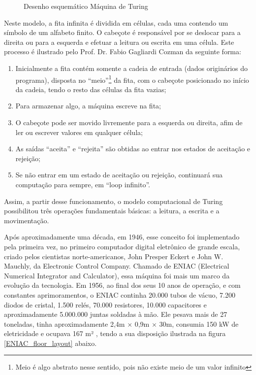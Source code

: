 \vspace{1cm}
\begin{figure}[H] \centering 
  \caption{\label{turing_machine} Desenho esquemático Máquina de Turing} 
\end{figure}

Neste modelo, a fita infinita é dividida em células, cada uma contendo um símbolo de um alfabeto finito. O cabeçote é responsável por se deslocar para a direita ou para a esquerda e efetuar a leitura ou escrita em uma célula. Este processo é ilustrado pelo Prof. Dr. Fabio Gagliardi Cozman \cite{7} da seguinte forma:

\begin{enumerate}
  \item Inicialmente a fita contém somente a cadeia de entrada (dados originários do programa), disposta no ``meio''\footnote{Meio é algo abstrato nesse sentido, pois não existe meio de um valor infinito} da fita, com o cabeçote posicionado no início da cadeia, tendo o resto das células da fita vazias;
  \item Para armazenar algo, a máquina escreve na fita;
  \item O cabeçote pode ser movido livremente para a esquerda ou direita, afim de ler ou escrever valores em qualquer célula;
  \item As saídas ``aceita'' e ``rejeita'' são obtidas ao entrar nos estados de aceitação e rejeição;
  \item Se não entrar em um estado de aceitação ou rejeição, continuará sua computação para sempre, em ``loop infinito''.
\end{enumerate}

Assim, a partir desse funcionamento, o modelo computacional de Turing possibilitou três operações fundamentais básicas: a leitura, a escrita e a movimentação.   

Após aproximadamente uma década, em 1946, esse conceito foi implementado pela primeira vez, no primeiro computador digital eletrônico de grande escala, criado pelos cientistas norte-americanos, John Presper Eckert e John W. Mauchly, da Electronic Control Company. Chamado de ENIAC (Electrical Numerical Integrator and Calculator), essa máquina foi mais um marco da evolução da tecnologia. Em 1956, ao final dos seus 10 anos de operação, e com constantes aprimoramentos, o ENIAC continha 20.000 tubos de vácuo, 7.200 diodos de cristal, 1.500 relés, 70.000 resistores, 10.000 capacitores e aproximadamente 5.000.000 juntas soldadas à mão. Ele pesava mais de 27 toneladas, tinha aproximadamente 2,4m × 0,9m × 30m, consumia 150 kW de eletricidade e ocupava 167 m² \cite{2}, tendo a sua disposição ilustrada na figura \ref{ENIAC_floor_layout} abaixo. 

